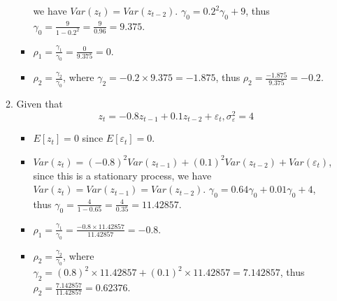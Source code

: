 \documentclass[12pt]{article}
\begin{document}
\begin{enumerate}
\begin{enumerate}
\begin{itemize}
            we have $Var(z_t) = Var(z_{t-2})$. $\gamma_0 = 0.2^2 \gamma_0 + 9$, 
            thus $\gamma_0 = \frac{9}{1 - 0.2^2} = \frac{9}{0.96} = 9.375$.
            \item $\rho_1 = \frac{\gamma_1}{\gamma_0} = \frac{0}{9.375} = 0$.
            \item $\rho_2 = \frac{\gamma_2}{\gamma_0}$, where $\gamma_2 = -0.2 \times 9.375 = -1.875$,
            thus $\rho_2 = \frac{-1.875}{9.375} = -0.2$.
        \end{itemize}   
        \item Given that
        \[ z_t = - 0.8 z_{t-1} + 0.1 z_{t-2} + \varepsilon_t, \sigma^2_{\varepsilon} = 4 \]
        \begin{itemize}
            \item $E[z_t] = 0$ since $E[\varepsilon_t] = 0$.
            \item $Var(z_t) = (-0.8)^2 Var(z_{t-1}) + (0.1)^2 Var(z_{t-2}) + Var(\varepsilon_t)$, 
            since this is a stationary process, we have $Var(z_t) = Var(z_{t-1}) = Var(z_{t-2})$. 
            $\gamma_0 = 0.64 \gamma_0 + 0.01 \gamma_0 + 4$, thus $\gamma_0 = \frac{4}{1 - 0.65} = \frac{4}{0.35} = 11.42857$.
            \item $\rho_1 = \frac{\gamma_1}{\gamma_0} = \frac{-0.8 \times 11.42857}{11.42857} = -0.8$.
            \item $\rho_2 = \frac{\gamma_2}{\gamma_0}$, where $\gamma_2 = (0.8)^2 \times 11.42857 + (0.1)^2 \times 11.42857 = 7.142857$,
            thus $\rho_2 = \frac{7.142857}{11.42857} = 0.62376$.
        \end{itemize}
    \end{enumerate}
\end{enumerate}
\end{document}
